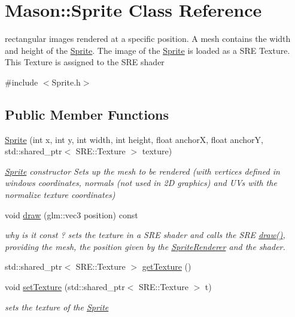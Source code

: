 \hypertarget{class_mason_1_1_sprite}{}\section{Mason\+:\+:Sprite Class Reference}
\label{class_mason_1_1_sprite}


rectangular images rendered at a specific position. A mesh contains the width and height of the \hyperlink{class_mason_1_1_sprite}{Sprite}. The image of the \hyperlink{class_mason_1_1_sprite}{Sprite} is loaded as a S\+RE Texture. This Texture is assigned to the S\+RE shader  




{\ttfamily \#include $<$Sprite.\+h$>$}

\subsection*{Public Member Functions}
\begin{DoxyCompactItemize}
\item 
\hyperlink{class_mason_1_1_sprite_a40dbab8285c1d3bdc95dfe1806736402}{Sprite} (int x, int y, int width, int height, float anchorX, float anchorY, std\+::shared\+\_\+ptr$<$ S\+R\+E\+::\+Texture $>$ texture)
\begin{DoxyCompactList}\small\item\em \hyperlink{class_mason_1_1_sprite}{Sprite} constructor Sets up the mesh to be rendered (with vertices defined in windows coordinates, normals (not used in 2D graphics) and U\+Vs with the normalize texture coordinates) \end{DoxyCompactList}\item 
void \hyperlink{class_mason_1_1_sprite_a6229a8bef359a9023f6510978bd95b0b}{draw} (glm\+::vec3 position) const
\begin{DoxyCompactList}\small\item\em why is it const ? sets the texture in a S\+RE shader and calls the S\+RE \hyperlink{class_mason_1_1_sprite_a6229a8bef359a9023f6510978bd95b0b}{draw()}, providing the mesh, the position given by the \hyperlink{class_mason_1_1_sprite_renderer}{Sprite\+Renderer} and the shader. \end{DoxyCompactList}\item 
std\+::shared\+\_\+ptr$<$ S\+R\+E\+::\+Texture $>$ \hyperlink{class_mason_1_1_sprite_a712bae6921e612c77150a2741a0be7b1}{get\+Texture} ()
\item 
void \hyperlink{class_mason_1_1_sprite_a0331c6ca9aeb29be568485209cabcf06}{set\+Texture} (std\+::shared\+\_\+ptr$<$ S\+R\+E\+::\+Texture $>$ t)
\begin{DoxyCompactList}\small\item\em sets the texture of the \hyperlink{class_mason_1_1_sprite}{Sprite} \end{DoxyCompactList}\end{DoxyCompactItemize}
